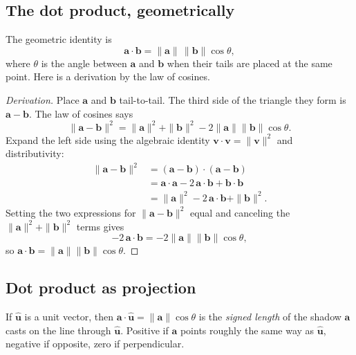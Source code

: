\documentclass{article}
\begin{document}
\subsection{The dot product, geometrically}

The geometric identity is
\[
\mathbf{a} \cdot \mathbf{b} = \|\mathbf{a}\|\,\|\mathbf{b}\|\cos\theta,
\]
where $\theta$ is the angle between $\mathbf{a}$ and $\mathbf{b}$ when their
tails are placed at the same point. Here is a derivation by the law of
cosines.

\begin{proof}[Derivation]
Place $\mathbf{a}$ and $\mathbf{b}$ tail-to-tail. The third side of the
triangle they form is $\mathbf{a}-\mathbf{b}$. The law of cosines says
\[
\|\mathbf{a}-\mathbf{b}\|^2 = \|\mathbf{a}\|^2 + \|\mathbf{b}\|^2 - 2\|\mathbf{a}\|\|\mathbf{b}\|\cos\theta.
\]
Expand the left side using the algebraic identity $\mathbf{v}\cdot\mathbf{v} = \|\mathbf{v}\|^2$ and distributivity:
\begin{align*}
\|\mathbf{a}-\mathbf{b}\|^2
   &= (\mathbf{a}-\mathbf{b})\cdot(\mathbf{a}-\mathbf{b}) \\
   &= \mathbf{a}\cdot\mathbf{a} - 2\,\mathbf{a}\cdot\mathbf{b} + \mathbf{b}\cdot\mathbf{b} \\
   &= \|\mathbf{a}\|^2 - 2\,\mathbf{a}\cdot\mathbf{b} + \|\mathbf{b}\|^2.
\end{align*}
Setting the two expressions for $\|\mathbf{a}-\mathbf{b}\|^2$ equal and
canceling the $\|\mathbf{a}\|^2 + \|\mathbf{b}\|^2$ terms gives
\[
-2\,\mathbf{a}\cdot\mathbf{b} = -2\|\mathbf{a}\|\|\mathbf{b}\|\cos\theta,
\]
so $\mathbf{a}\cdot\mathbf{b} = \|\mathbf{a}\|\|\mathbf{b}\|\cos\theta$.
\end{proof}

\subsection{Dot product as projection}

If $\hat{\mathbf{u}}$ is a unit vector, then
$\mathbf{a} \cdot \hat{\mathbf{u}} = \|\mathbf{a}\| \cos\theta$ is the
\emph{signed length} of the shadow $\mathbf{a}$ casts on the line through
$\hat{\mathbf{u}}$. Positive if $\mathbf{a}$ points roughly the same way as
$\hat{\mathbf{u}}$, negative if opposite, zero if perpendicular.

\begin{center}
\end{center}
\end{document}
